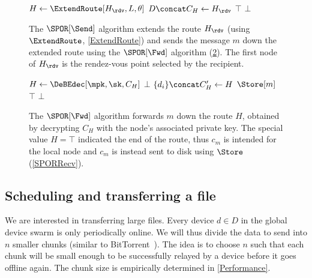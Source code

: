 \begin{figure}
  \begin{algorithmic}
      \State $H\gets \ExtendRoute[H_\rdv, L, \theta]$
      \State $D\concat C_H\gets H_\rdv$
          \State \Return $\top$
        \EndIf
      \EndFor
      \State \Return $\bot$
    \EndFunction
  \end{algorithmic}
  \caption{\label{SPORSend}%
    The \(\SPOR[\Send]\) algorithm extends the route \(H_\rdv\) (using 
    \(\ExtendRoute\), \cref{ExtendRoute}) and sends the message \(m\) down the 
    extended route using the \(\SPOR[\Fwd]\) algorithm (\cref{SPORFwd}).
    The first node of \(H_\rdv\) is the rendez-vous point selected by the 
    recipient.
  }
\end{figure}

\begin{figure}
  \begin{algorithmic}
      \State $H\gets \DeBEdec[\mpk, \sk, C_H]$
        \State \Return $\bot$
      \EndIf
      \State $\{d_i\}\concat C_H'\gets H$
        \State \Return $\Store[m]$
      \EndIf
          \State \Return $\top$
        \EndIf
      \EndFor
      \State \Return $\bot$
    \EndFunction
  \end{algorithmic}
  \caption{\label{SPORFwd}%
    The \(\SPOR[\Fwd]\) algorithm forwards \(m\) down the route \(H\), obtained 
    by decrypting \(C_H\) with the node's associated private key.
    The special value \(H = \top\) indicated the end of the route, thus \(c_m\) 
    is intended for the local node and \(c_m\) is instead sent to disk using 
    \(\Store\) (\cref{SPORRecv}).%
  }
\end{figure}

\subsection{Scheduling and transferring a file}%
\label{file-transfer}

We are interested in transferring large files.
Every device \(d\in D\) in the global device swarm is only periodically online.
We will thus divide the data to send into \(n\) smaller chunks (similar to 
BitTorrent~\cite{BitTorrent}).
The idea is to choose \(n\) such that each chunk will be small enough to be 
successfully relayed by a device before it goes offline again.
The chunk size is empirically determined in \cref{Performance}.

